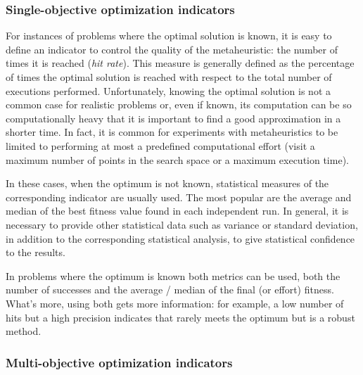 \subsubsection{Single-objective optimization indicators}

For instances of problems where the optimal solution is known, it is easy to define an indicator to control the quality of the metaheuristic: the number of times it is reached (\emph {hit rate}). This measure is generally defined as the percentage of times the optimal solution is reached with respect to the total number of executions performed. Unfortunately, knowing the optimal solution is not a common case for realistic problems or, even if known, its computation can be so computationally heavy that it is important to find a good approximation in a shorter time. In fact, it is common for experiments with metaheuristics to be limited to performing at most a predefined computational effort (visit a maximum number of points in the search space or a maximum execution time).

In these cases, when the optimum is not known, statistical measures of the corresponding indicator are usually used. The most popular are the average and median of the best fitness value found in each independent run. In general, it is necessary to provide other statistical data such as variance or standard deviation, in addition to the corresponding statistical analysis, to give statistical confidence to the results.

In problems where the optimum is known both metrics can be used, both the number of successes and the average / median of the final (or effort) fitness. What's more, using both gets more information: for example, a low number of hits but a high precision indicates that rarely meets the optimum but is a robust method.

\subsubsection{Multi-objective optimization indicators}

